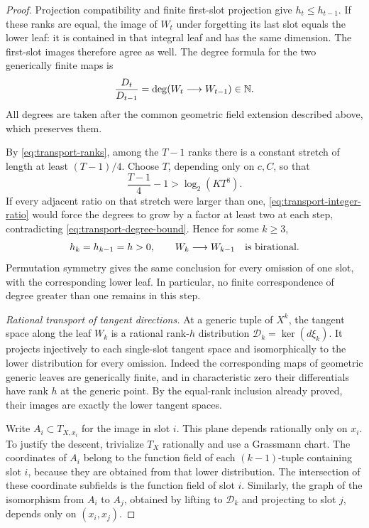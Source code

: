 \begin{proof}
Projection compatibility and finite first-slot projection give
\(h_t\le h_{t-1}\).  If these ranks are equal, the image of \(W_t\)
under forgetting its last slot equals the lower leaf: it is contained
in that integral leaf and has the same dimension.  The first-slot
images therefore agree as well.  The degree formula for the two
generically finite maps is
\begin{equation}\label{eq:transport-integer-ratio}
 \frac{D_t}{D_{t-1}}
 =\deg(W_t\longrightarrow W_{t-1})\in\mathbb N.
\end{equation}
All degrees are taken after the common geometric field extension
described above, which preserves them.

By \eqref{eq:transport-ranks}, among the \(T-1\) ranks there is a
constant stretch of length at least \((T-1)/4\).  Choose \(T\),
depending only on \(c,C\), so that
\[
 \frac{T-1}{4}-1>\log_2(KT^8).
\]
If every adjacent ratio on that stretch were
larger than one, \eqref{eq:transport-integer-ratio} would force the
degrees to grow by a factor at least two at each step, contradicting
\eqref{eq:transport-degree-bound}.  Hence for some \(k\ge3\),
\begin{equation}\label{eq:transport-birational-omission}
 h_k=h_{k-1}=h>0,
 \qquad W_k\longrightarrow W_{k-1}
 \quad\hbox{is birational}.
\end{equation}
Permutation symmetry gives the same conclusion for every omission of
one slot, with the corresponding lower leaf.  In particular, no
finite correspondence of degree greater than one remains in this
step.

\medskip\noindent
\emph{Rational transport of tangent directions.}
At a generic tuple of \(X^k\), the tangent space along the leaf
\(W_k\) is a rational rank-\(h\) distribution
\(\mathcal D_k=\ker(d\xi_k)\).  It projects injectively to each
single-slot tangent space and isomorphically to the lower distribution
for every omission.  Indeed the corresponding maps of geometric
generic leaves are generically finite, and in characteristic zero
their differentials have rank \(h\) at the generic point.  By the
equal-rank inclusion already proved, their images are exactly the
lower tangent spaces.

Write \(A_i\subset T_{X,x_i}\) for the image in slot \(i\).
This plane depends rationally only on \(x_i\).  To justify the
descent, trivialize \(T_X\) rationally and use a Grassmann chart.
The coordinates of \(A_i\) belong to the function field of each
\((k-1)\)-tuple containing slot \(i\), because they are obtained
from that lower distribution.  The intersection of these coordinate
subfields is the function field of slot \(i\).  Similarly, the graph
of the isomorphism from \(A_i\) to \(A_j\), obtained by lifting to
\(\mathcal D_k\) and projecting to slot \(j\), depends only on
\((x_i,x_j)\).


\end{proof}
